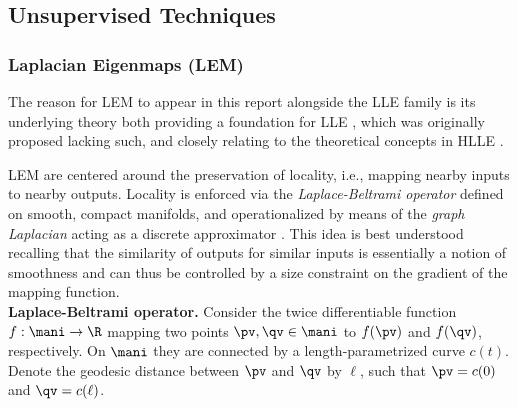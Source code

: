 \subsection{Unsupervised Techniques}
\label{unsupervised}


\subsubsection{Laplacian Eigenmaps (LEM)}
\label{laplace}

The reason for LEM to appear in this report alongside the LLE family is its 
underlying theory both providing a foundation for LLE \citep{belkinniyogi2003}, 
which was originally proposed lacking such, and closely relating to the 
theoretical concepts in HLLE \citep{donohogrimes2003}.

LEM are centered around the preservation of locality, i.e., mapping nearby 
inputs to nearby outputs.
Locality is enforced via the \textit{Laplace-Beltrami operator} defined on 
smooth, compact manifolds, and operationalized by means of the \textit{graph Laplacian} acting as a discrete approximator \citep{belkinniyogi2003}.
This idea is best understood recalling that the similarity of outputs for 
similar inputs is essentially a notion of smoothness and can thus be controlled 
by a size constraint on the gradient of the mapping function.
\\

\textbf{Laplace-Beltrami operator.}
Consider the twice differentiable function $f: \mani \rightarrow \R$ mapping 
two points $\pv, \qv \in \mani$ to $f(\pv)$ and $f(\qv)$, respectively. 
On $\mani$ they are connected by a length-parametrized curve $c(t)$.
Denote the geodesic distance between $\pv$ and $\qv$ by $\ell$, such that
$\pv = c(0)$ and $\qv = c(\ell)$.

